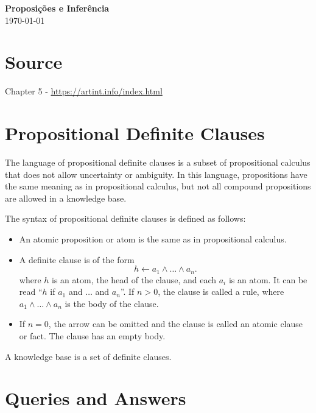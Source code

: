 \documentclass[12pt,a4paper, brazil]{article}
\begin{document}
\begin{center}
{\textbf {\huge Proposições e Inferência}}\\[5mm]
\today\\[5mm] %
\end{center}


\section*{Source}

Chapter 5 - \url{https://artint.info/index.html}


\section{Propositional Definite Clauses}

The language of propositional definite clauses is a subset of propositional calculus that does not allow uncertainty or ambiguity. In this language, propositions have the same meaning as in propositional calculus, but not all compound propositions are allowed in a knowledge base.

The syntax of propositional definite clauses is defined as follows:

\begin{itemize}
    \item An atomic proposition or atom is the same as in propositional calculus.
    \item A definite clause is of the form
    \[ h \leftarrow a_1 \land \ldots \land a_n. \]
    where \( h \) is an atom, the head of the clause, and each \( a_i \) is an atom. It can be read “\( h \) if \( a_1 \) and \(\ldots\) and \( a_n \)”.
    If \( n > 0 \), the clause is called a rule, where \( a_1 \land \ldots \land a_n \) is the body of the clause.
    \item If \( n = 0 \), the arrow can be omitted and the clause is called an atomic clause or fact. The clause has an empty body.
\end{itemize}

A knowledge base is a set of definite clauses.


\section{Queries and Answers}
\end{document}
